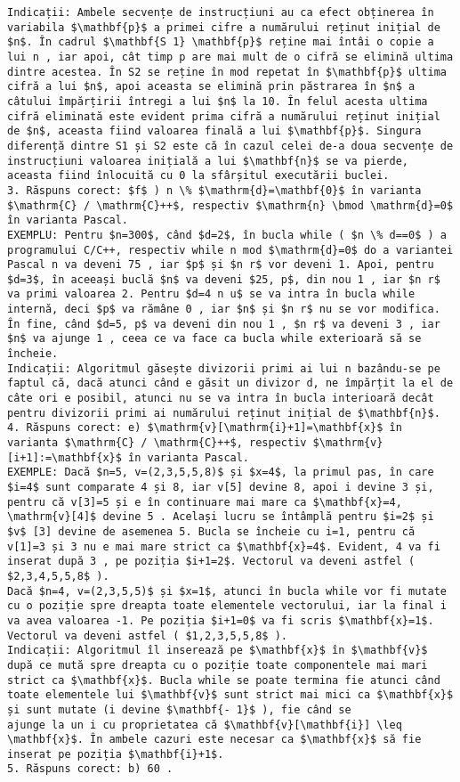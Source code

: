 \begin{verbatim}
Indicații: Ambele secvențe de instrucțiuni au ca efect obținerea în variabila $\mathbf{p}$ a primei cifre a numărului reținut inițial de $n$. În cadrul $\mathbf{S 1} \mathbf{p}$ reține mai întâi o copie a lui n , iar apoi, cât timp p are mai mult de o cifră se elimină ultima dintre acestea. În S2 se reține în mod repetat în $\mathbf{p}$ ultima cifră a lui $n$, apoi aceasta se elimină prin păstrarea în $n$ a câtului împărțirii întregi a lui $n$ la 10. În felul acesta ultima cifră eliminată este evident prima cifră a numărului reținut inițial de $n$, aceasta fiind valoarea finală a lui $\mathbf{p}$. Singura diferență dintre S1 și S2 este că în cazul celei de-a doua secvențe de instrucțiuni valoarea inițială a lui $\mathbf{n}$ se va pierde, aceasta fiind înlocuită cu 0 la sfârșitul executării buclei.
3. Răspuns corect: $f$ ) n \% $\mathrm{d}=\mathbf{0}$ în varianta $\mathrm{C} / \mathrm{C}++$, respectiv $\mathrm{n} \bmod \mathrm{d}=0$ în varianta Pascal.
EXEMPLU: Pentru $n=300$, când $d=2$, în bucla while ( $n \% d==0$ ) a programului C/C++, respectiv while n mod $\mathrm{d}=0$ do a variantei Pascal n va deveni 75 , iar $p$ și $n r$ vor deveni 1. Apoi, pentru $d=3$, în aceeași buclă $n$ va deveni $25, p$, din nou 1 , iar $n r$ va primi valoarea 2. Pentru $d=4 n u$ se va intra în bucla while internă, deci $p$ va rămâne 0 , iar $n$ și $n r$ nu se vor modifica. În fine, când $d=5, p$ va deveni din nou 1 , $n r$ va deveni 3 , iar $n$ va ajunge 1 , ceea ce va face ca bucla while exterioară să se încheie.
Indicații: Algoritmul găsește divizorii primi ai lui n bazându-se pe faptul că, dacă atunci când e găsit un divizor d, ne împărțit la el de câte ori e posibil, atunci nu se va intra în bucla interioară decât pentru divizorii primi ai numărului reținut inițial de $\mathbf{n}$.
4. Răspuns corect: e) $\mathrm{v}[\mathrm{i}+1]=\mathbf{x}$ în varianta $\mathrm{C} / \mathrm{C}++$, respectiv $\mathrm{v}[i+1]:=\mathbf{x}$ în varianta Pascal.
EXEMPLE: Dacă $n=5, v=(2,3,5,5,8)$ și $x=4$, la primul pas, în care $i=4$ sunt comparate 4 și 8, iar v[5] devine 8, apoi i devine 3 și, pentru că v[3]=5 și e în continuare mai mare ca $\mathbf{x}=4, \mathrm{v}[4]$ devine 5 . Același lucru se întâmplă pentru $i=2$ și $v$ [3] devine de asemenea 5. Bucla se încheie cu i=1, pentru că v[1]=3 și 3 nu e mai mare strict ca $\mathbf{x}=4$. Evident, 4 va fi inserat după 3 , pe poziția $i+1=2$. Vectorul va deveni astfel ( $2,3,4,5,5,8$ ).
Dacă $n=4, v=(2,3,5,5)$ și $x=1$, atunci în bucla while vor fi mutate cu o poziție spre dreapta toate elementele vectorului, iar la final i va avea valoarea -1. Pe poziția $i+1=0$ va fi scris $\mathbf{x}=1$. Vectorul va deveni astfel ( $1,2,3,5,5,8$ ).
Indicații: Algoritmul îl inserează pe $\mathbf{x}$ în $\mathbf{v}$ după ce mută spre dreapta cu o poziție toate componentele mai mari strict ca $\mathbf{x}$. Bucla while se poate termina fie atunci când toate elementele lui $\mathbf{v}$ sunt strict mai mici ca $\mathbf{x}$ și sunt mutate (i devine $\mathbf{- 1}$ ), fie când se
ajunge la un i cu proprietatea că $\mathbf{v}[\mathbf{i}] \leq \mathbf{x}$. În ambele cazuri este necesar ca $\mathbf{x}$ să fie inserat pe poziția $\mathbf{i}+1$.
5. Răspuns corect: b) 60 .


\end{verbatim}
